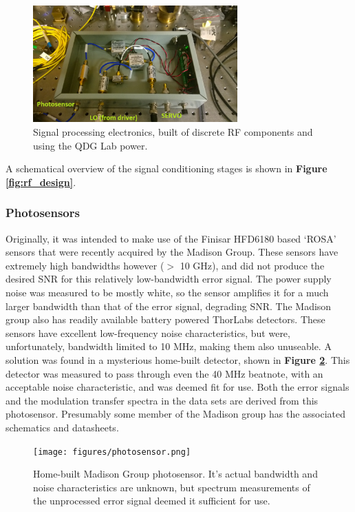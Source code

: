 \begin{figure}
  \centering\includegraphics[width=0.7\textwidth]{figures/ebox.png}
  \caption[Signal processing electronics]{Signal processing electronics, built of discrete RF components and using the QDG Lab power.}
  \label{fig:ebox}
\end{figure}

A schematical overview of the signal conditioning stages is shown in \textbf{Figure \ref{fig:rf_design}}.

    \subsubsection{Photosensors}

Originally, it was intended to make use of the Finisar HFD6180 based `ROSA' sensors that were recently acquired by the Madison Group. These sensors have extremely high bandwidths however ($>$ 10 GHz), and did not produce the desired SNR for this relatively low-bandwidth error signal. The power supply noise was measured to be mostly white, so the sensor amplifies it for a much larger bandwidth than that of the error signal, degrading SNR. The Madison group also has readily available battery powered ThorLabs detectors. These sensors have excellent low-frequency noise characteristics, but were, unfortunately, bandwidth limited to 10 MHz, making them also unuseable. A solution was found in a mysterious home-built detector, shown in \textbf{Figure \ref{fig:detector}}. This detector was measured to pass through even the 40 MHz beatnote, with an acceptable noise characteristic, and was deemed fit for use. Both the error signals and the modulation transfer spectra in the data sets are derived from this photosensor.
Presumably some member of the Madison group has the associated schematics and datasheets.

\begin{figure}
  \centering\texttt{[image: figures/photosensor.png]}
  \caption[Photosensor]{Home-built Madison Group photosensor. It's actual bandwidth and noise characteristics are unknown, but spectrum measurements of the unprocessed error signal deemed it sufficient for use.}
  \label{fig:detector}
\end{figure}


